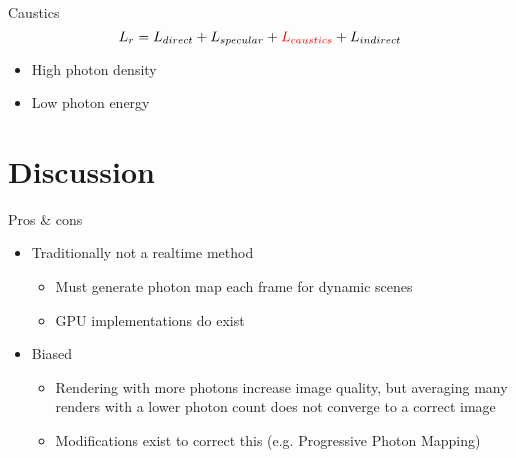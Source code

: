\documentclass{beamer}
\begin{document}
      \begin{frame}{Caustics}
        \[
          L_r = L_{direct} + L_{specular} + {\color{red} L_{caustics}} + L_{indirect}
        \]

        \begin{itemize}
          \item<2-> High photon density
          \item<3-> Low photon energy
        \end{itemize}

      \end{frame}

  \section{Discussion}
    \begin{frame}{Pros \& cons}
        \begin{itemize}
          \item<2-> Traditionally not a realtime method
            \begin{itemize}
              \item<3-> Must generate photon map each frame for dynamic scenes
              \item<4-> GPU implementations do exist
            \end{itemize}
          \item<5-> Biased
            \begin{itemize}
              \item<6-> Rendering with more photons increase image quality, but averaging many renders with a lower photon count does not converge to a correct image
              \item<7-> Modifications exist to correct this (e.g. Progressive Photon Mapping)
            \end{itemize}
        \end{itemize}
    \end{frame}
\end{document}
